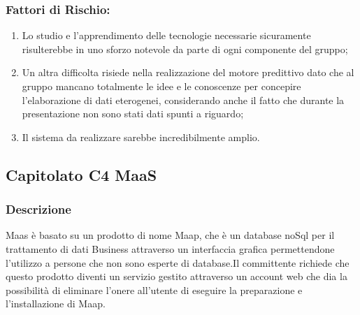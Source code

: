 \documentclass[12pt,a4paper]{article}
\begin{document}
\subsubsection{Fattori di Rischio:}
	\begin{enumerate}
\item	Lo studio e l'apprendimento delle tecnologie necessarie sicuramente risulterebbe in uno sforzo notevole da parte di ogni componente del gruppo;

\item	Un altra difficolta risiede nella realizzazione del motore predittivo dato che al gruppo mancano totalmente le idee e le conoscenze per concepire l'elaborazione di dati eterogenei, considerando anche il fatto che durante la presentazione non sono	stati dati spunti a riguardo;
\item	Il sistema da realizzare sarebbe incredibilmente amplio.
\end{enumerate}

\newpage
\subsection{Capitolato C4 MaaS}
\subsubsection{Descrizione}
Maas è basato su un prodotto di nome Maap, che è un database noSql per il trattamento di dati Business attraverso un interfaccia grafica permettendone l'utilizzo a persone che non sono esperte di database.Il committente richiede che questo prodotto diventi un servizio gestito attraverso un account web che dia la possibilità di eliminare l'onere all'utente di eseguire la preparazione e l'installazione di Maap.
\end{document}
